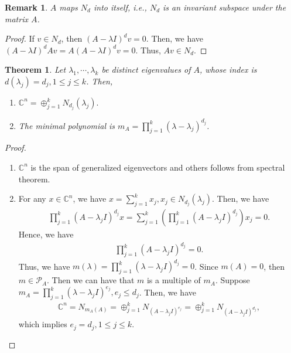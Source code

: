 \documentclass[11pt]{book}
\newtheorem{theorem}{Theorem}[chapter]
\newtheorem{remark}{Remark}[chapter]
\theoremstyle{definition}
\numberwithin{equation}{chapter}
\begin{document}
\medskip

\begin{remark}
$A$ maps $N_d$ into itself, i.e., $N_d$ is an invariant subspace under the matrix $A$.
\end{remark}
\begin{proof}
If $v\in N_d$, then $(A - \lambda I)^d v = 0$. Then, we have $(A - \lambda I)^d Av = A(A - \lambda I)^d v = 0$. Thus, $Av \in N_d$.
\end{proof}

\medskip

\begin{theorem}
Let $\lambda_1,\cdots,\lambda_k$ be distinct eigenvalues of $A$, whose index is $d\left(\lambda_j\right) = d_j, 1\leq j \leq k$. Then,
\begin{enumerate}[label=(\alph*)]
    \item $\mathbb{C}^n = \oplus^k_{j=1}N_{d_j}(\lambda_j).$
    \item The minimal polynomial is $m_A = \prod^k_{j=1}\left(\lambda - \lambda_j \right)^{d_j}$.
\end{enumerate}
\end{theorem}
\begin{proof}
~\begin{enumerate}[label=(\alph*)]
    \item $\mathbb{C}^n$ is the span of generalized eigenvectors and others follows from spectral theorem.
    \item For any $x\in\mathbb{C}^n$, we have $x = \sum^k_{j=1}x_j, x_j\in N_{d_j}(\lambda_j)$. Then, we have 
    \begin{align*}
        \prod^k_{j=1} \left(A - \lambda_j I\right)^{d_j}x = \sum^k_{j=1}\left(\prod^k_{j=1} \left(A - \lambda_j I\right)^{d_j} \right)x_j = 0.
    \end{align*}
    Hence, we have 
    \begin{align*}
        \prod^k_{j=1} \left(A - \lambda_j I\right)^{d_j} = 0.
    \end{align*}
    Thus, we have $m(\lambda) = \prod^k_{j=1} \left(\lambda - \lambda_j I\right)^{d_j} = 0$. Since $m(A) = 0$, then $m\in \mathcal{P}_A$. Then we can have that $m$ is a multiple of $m_A$. Suppose $m_A = \prod^k_{j=1} \left(\lambda - \lambda_j I\right)^{e_j}, e_j\leq d_j$. Then, we have 
    \begin{align*}
        \mathbb{C}^n = N_{m_A(A)} = \oplus^k_{j=1}N_{(A-\lambda_j I)^{e_j}} = \oplus^k_{j=1}N_{(A-\lambda_j I)^{d_j}},
    \end{align*}
    which implies $e_j = d_j, 1\leq j \leq k$.
\end{enumerate}
\end{proof}
\end{document}
